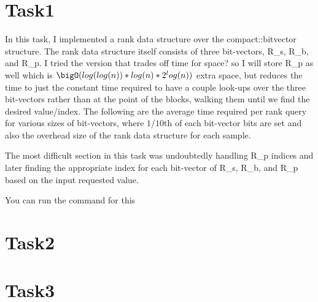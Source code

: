\documentclass[11pt]{article}
\begin{document}
    \section{Task1}
    In this task, I implemented a rank data structure over the compact::bitvector structure.
    The rank data structure itself consists of three bit-vectors, R_s, R_b, and R_p. I tried the version that
    trades off time for space? so I will store R_p as well which is $\bigO(log(log(n))*log(n)*2^log(n))$ extra space,
    but reduces the time to just the constant time required to have a couple look-ups over the three bit-vectors
    rather than at the point of the blocks, walking them until we find the desired value/index.
    The following are the average time required per rank query for various sizes of bit-vectors,
    where $1/10$th of each bit-vector bits are set and also the overhead size of the rank data structure for each sample.


    The most difficult section in this task was undoubtedly handling R_p indices and later finding the appropriate index
    for each bit-vector of R_s, R_b, and R_p based on the input requested value.

    You can run the command for this

    \section{Task2}

    \section{Task3}
\end{document}
